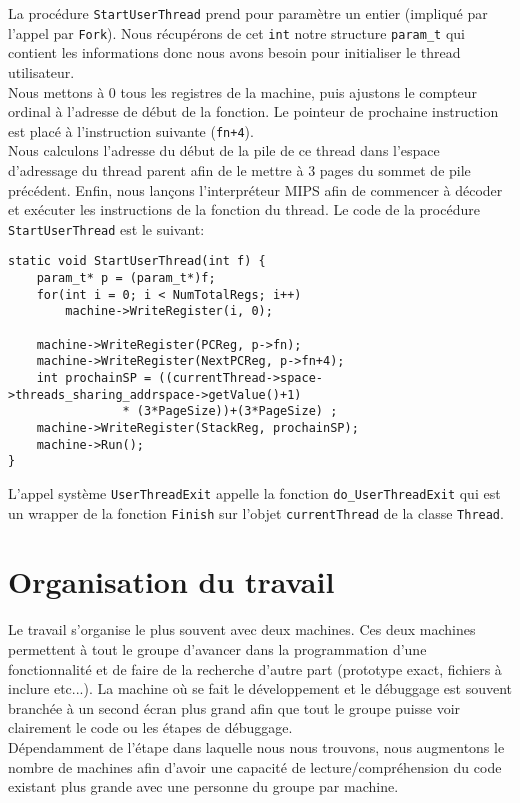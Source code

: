 \documentclass{report}
\begin{document}
La procédure \texttt{StartUserThread} prend pour paramètre un entier (impliqué par l'appel par \texttt{Fork}). Nous récupérons de cet \texttt{int} notre structure \texttt{param\_t} qui contient les informations donc nous avons besoin pour initialiser le thread utilisateur.\\
Nous mettons à 0 tous les registres de la machine, puis ajustons le compteur ordinal à l'adresse de début de la fonction. Le pointeur de prochaine instruction est placé à l'instruction suivante (\texttt{fn+4}).\\
Nous calculons l'adresse du début de la pile de ce thread dans l'espace d'adressage du thread parent afin de le mettre à 3 pages du sommet de pile précédent. Enfin, nous lançons l'interpréteur MIPS afin de commencer à décoder et exécuter les instructions de la fonction du thread. Le code de la procédure \texttt{StartUserThread} est le suivant:
\begin{verbatim}
static void StartUserThread(int f) {
    param_t* p = (param_t*)f;
    for(int i = 0; i < NumTotalRegs; i++)
        machine->WriteRegister(i, 0);
		
    machine->WriteRegister(PCReg, p->fn);
    machine->WriteRegister(NextPCReg, p->fn+4);
    int prochainSP = ((currentThread->space->threads_sharing_addrspace->getValue()+1) 
                * (3*PageSize))+(3*PageSize) ;
    machine->WriteRegister(StackReg, prochainSP);
    machine->Run();
}
\end{verbatim}

L'appel système \texttt{UserThreadExit} appelle la fonction \texttt{do\_UserThreadExit} qui est un wrapper de la fonction \texttt{Finish} sur l'objet \texttt{currentThread} de la classe \texttt{Thread}.
\section*{Organisation du travail}
Le travail s'organise le plus souvent avec deux machines. Ces deux machines permettent à tout le groupe d'avancer dans la programmation d'une fonctionnalité et de faire de la recherche d'autre part (prototype exact, fichiers à inclure etc...). La machine où se fait le développement et le débuggage est souvent branchée à un second écran plus grand afin que tout le groupe puisse voir clairement le code ou les étapes de débuggage.\\

Dépendamment de l'étape dans laquelle nous nous trouvons, nous augmentons le nombre de machines afin d'avoir une capacité de lecture/compréhension du code existant plus grande avec une personne du groupe par machine.\\
\end{document}
